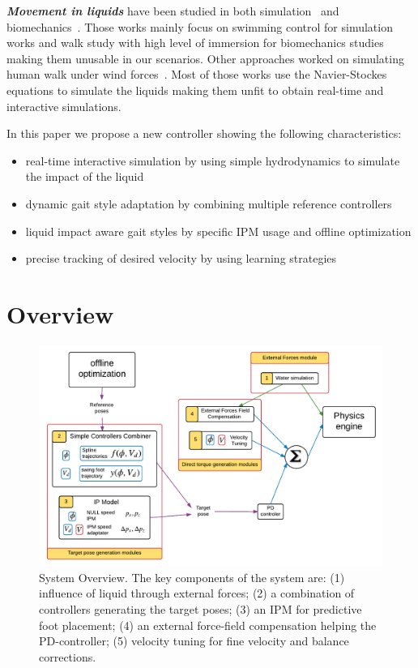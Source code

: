 \documentclass[conference]{acmsiggraph}
\begin{document}
\textbf{\textit{Movement in liquids}} have been studied in both simulation~\cite{yang2004layered,si2014realistic} and biomechanics~\cite{barela2006biomechanical,chevutschi2009comparison}. Those works mainly focus on swimming control for simulation works and walk study with high level of immersion for biomechanics studies making them unusable in our scenarios. Other approaches worked on simulating human walk under wind forces~\cite{lentine2011creature}. Most of those works use the Navier-Stockes equations to simulate the liquids making them unfit to obtain real-time and interactive simulations.

In this paper we propose a new controller showing the following characteristics:
\begin{itemize}
\item{real-time interactive simulation by using simple hydrodynamics to simulate the impact of the liquid}
\item{dynamic gait style adaptation by combining multiple reference controllers}
\item{liquid impact aware gait styles by specific IPM usage and offline optimization}
\item{precise tracking of desired velocity by using learning strategies}
\end{itemize}

\section{Overview}
\label{sec:overview}

\begin{figure}[t]
\centering
\includegraphics[scale=0.45]{images/general_process.pdf}
\caption{System Overview. The key components of the system are: (1) influence of liquid through external forces; (2) a combination of controllers generating the target poses; (3) an IPM for predictive foot placement; (4) an external force-field compensation helping the PD-controller; (5) velocity tuning for fine velocity and balance corrections.}
\label{fig:shema_controler}
\end{figure}
\end{document}
